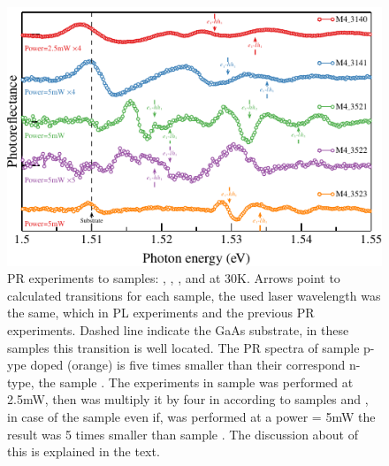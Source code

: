 \begin{figure}[ht!]
	\centering
	\includegraphics[width=\textwidth]{../figures/chapter-3/pr-plots/build/pr-set2.pdf}
	\caption{ PR experiments to samples: , , ,  and  at 30K. Arrows point to calculated transitions for each sample, the used laser wavelength was the same, which in PL experiments and the previous PR experiments. Dashed line indicate the GaAs substrate, in these samples this transition is well located.  The PR spectra of sample  p-ype doped (orange) is five times smaller  than their correspond n-type, the sample . The experiments in sample  was performed at 2.5mW, then was multiply it by four in according to samples  and , in case of the sample even if,  was performed at a power = 5mW the result was 5 times smaller than sample . The discussion about of this is explained in the text. }
	\label{fig:chapter-3-PR-PLOT-SET2}
\end{figure}

